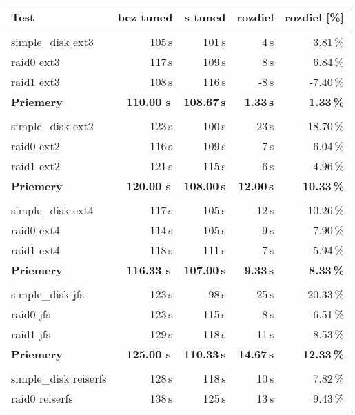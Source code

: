 \begin{table}[H]
\begin{center}
\begin{tabular}{|l|r r r r|}
    \hline
    \textbf{Test} & \textbf{bez tuned} & \textbf{s tuned} & \textbf{rozdiel} & \textbf{rozdiel [\%]} \\
    \hline & \\[-1em]\hline
    simple\_disk ext3 & 105\,s & 101\,s & 4\,s & 3.81\,\% \\
    raid0 ext3 & 117\,s & 109\,s & 8\,s & 6.84\,\% \\
    raid1 ext3 & 108\,s & 116\,s & -8\,s & -7.40\,\% \\
    \hline
    \textbf{Priemery} & \textbf{110.00 s}\,& \textbf{108.67\,s} & \textbf{1.33\,s} & \textbf{1.33\,\%} \\
    \hline & \\[-1em]\hline
    simple\_disk ext2 & 123\,s & 100\,s & 23\,s & 18.70\,\% \\
    raid0 ext2 & 116\,s & 109\,s & 7\,s & 6.04\,\% \\
    raid1 ext2 & 121\,s & 115\,s & 6\,s & 4.96\,\% \\
    \hline
    \textbf{Priemery} & \textbf{120.00 s}\,& \textbf{108.00\,s} & \textbf{12.00\,s} & \textbf{10.33\,\%} \\
    \hline & \\[-1em]\hline
    simple\_disk ext4 & 117\,s & 105\,s & 12\,s & 10.26\,\% \\
    raid0 ext4 & 114\,s & 105\,s & 9\,s & 7.90\,\% \\
    raid1 ext4 & 118\,s & 111\,s & 7\,s & 5.94\,\% \\
    \hline
    \textbf{Priemery} & \textbf{116.33 s}\,& \textbf{107.00\,s} & \textbf{9.33\,s} & \textbf{8.33\,\%} \\
    \hline & \\[-1em]\hline
    simple\_disk jfs & 123\,s & 98\,s & 25\,s & 20.33\,\% \\
    raid0 jfs & 123\,s & 115\,s & 8\,s & 6.51\,\% \\
    raid1 jfs & 129\,s & 118\,s & 11\,s & 8.53\,\% \\
    \hline
    \textbf{Priemery} & \textbf{125.00 s}\,& \textbf{110.33\,s} & \textbf{14.67\,s} & \textbf{12.33\,\%} \\
    \hline & \\[-1em]\hline
    simple\_disk reiserfs & 128\,s & 118\,s & 10\,s & 7.82\,\% \\
    raid0 reiserfs & 138\,s & 125\,s & 13\,s & 9.43\,\% \\

\end{tabular}
\end{center}
\end{table}
